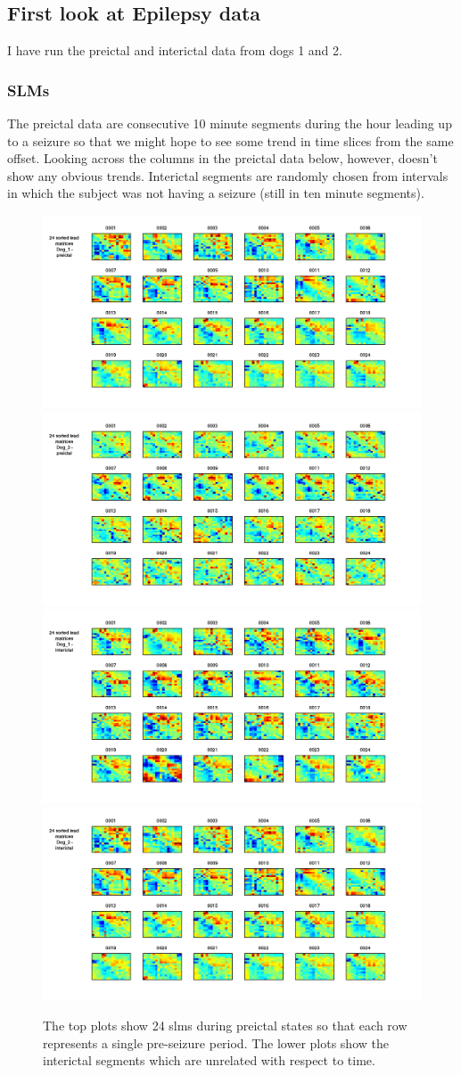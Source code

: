\documentclass[11pt]{article}
\begin{document}
\subsection{First look at Epilepsy data}
I have run the preictal and interictal data from dogs 1 and 2. 
\subsubsection{SLMs}
The preictal data are consecutive 10 minute segments during the hour leading up to a seizure so that we might hope to see some trend in time slices from the same offset. Looking across the columns in the preictal data below, however, doesn't show any obvious trends. Interictal segments are randomly chosen from intervals in which the subject was not having a seizure (still in ten minute segments). 
\begin{figure}[H]
\centering
\includegraphics[width=.49\textwidth]{pictures/24slm_Pre1.png}
\includegraphics[width=.49\textwidth]{pictures/24slm_pre2.png}
\includegraphics[width=.49\textwidth]{pictures/24slm_inter1.png}
\includegraphics[width=.49\textwidth]{pictures/24slm_inter2.png}
\caption{The top plots show 24 slms during preictal states so that each row represents a single pre-seizure period. The lower plots show the interictal segments which are unrelated with respect to time.}
\end{figure}
\end{document}
